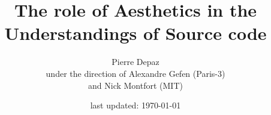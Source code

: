 \documentclass{book}
\begin{document}
\title{The role of Aesthetics in the Understandings of Source code}
\author{Pierre Depaz\\under the direction of Alexandre Gefen (Paris-3)\\and Nick Montfort (MIT)}
\date{last updated: \today}
\maketitle



\pagebreak



\pagebreak






\end{document}

